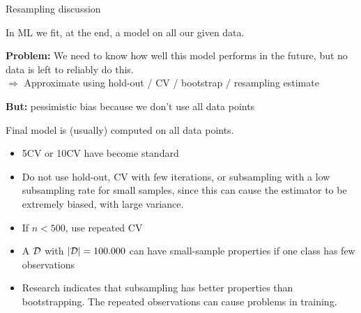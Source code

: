 \documentclass[11pt,compress,t,notes=noshow, xcolor=table]{beamer}
\begin{document}
%

\begin{vbframe}{Resampling discussion}

In ML we fit, at the end, a model on all our given data.\\

\lz

\textbf{Problem:} We need to know how well this model performs in the future,
but no data is left to reliably do this.\\

$\Rightarrow$ Approximate using hold-out / CV / bootstrap / resampling estimate\\

\lz

\textbf{But:} pessimistic bias because we don't use all data points\\

\lz

Final model is (usually) computed on all data points.


\framebreak

\begin{itemize}
  \item 5CV or 10CV have become standard
  \item Do not use hold-out, CV with few iterations, or subsampling with a low subsampling rate for small samples, since this can cause the estimator to be extremely biased, with large variance.
  \item If $n < 500$, use
  repeated CV
  \item A $\mathcal{D}$ with $|\mathcal{D}| = 100.000$ can have small-sample properties if one class has few observations
  \item Research indicates that subsampling has better properties than
    bootstrapping. The repeated observations can cause problems in training.
\end{itemize}
\end{vbframe}

\endlecture
\end{document}
